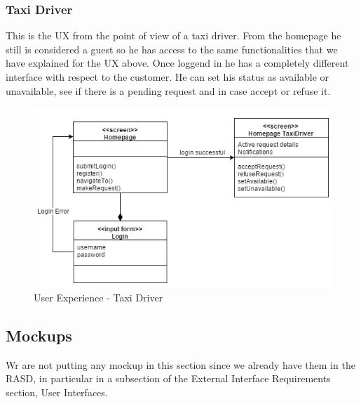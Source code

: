 \subsubsection{Taxi Driver}
This is the UX from the point of view of a taxi driver. From the homepage he still is considered a guest so he has access to the same functionalities that we have explained for the UX above. Once loggend in he has a completely different interface with respect to the customer. He can set his status as available or unavailable, see if there is a pending request and in case accept or refuse it.
\begin{figure}[h!]
	\begin{center}
		\includegraphics[width=1\linewidth]{../SE2_IMAGES/TaxiUX}
		\caption{User Experience - Taxi Driver}
	\end{center}
\end{figure}
\subsection{Mockups}
Wr are not putting any mockup in this section since we already have them in the RASD, in particular in a subsection of the External Interface Requirements section, User Interfaces.
